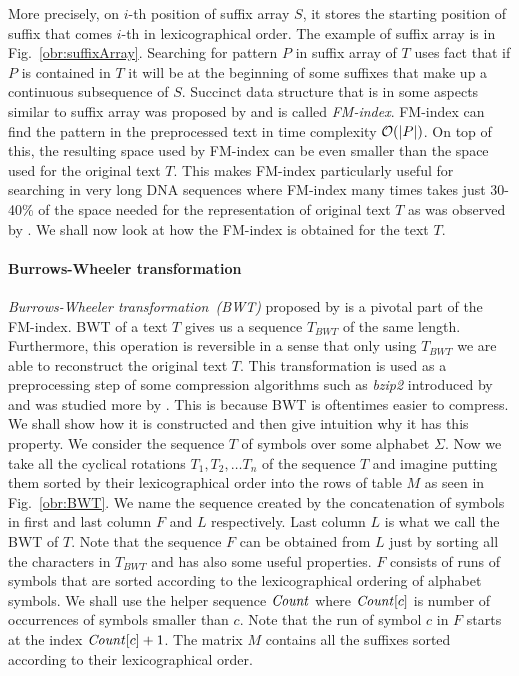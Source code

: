 More precisely, on $i$-th position of suffix array $S$, it stores the starting position of
suffix that comes $i$-th in lexicographical order. The example of suffix array is in
Fig.~\ref{obr:suffixArray}. Searching for pattern $P$ in suffix array of $T$ uses fact that
if $P$ is contained in $T$ it will be at the beginning of some suffixes that make up a
continuous subsequence of $S$. Succinct data structure that is in some aspects similar to
suffix array was proposed by \cite{ferragina2000opportunistic} and is called \textit{FM-index}.
FM-index can find the pattern in the preprocessed text in time complexity $\mathcal{O}(|P|)$. On top
of this, the resulting space used by FM-index can be even smaller than the space used for the original
text $T$. This makes FM-index particularly useful for searching in very long DNA sequences where
FM-index many times takes just 30-40\% of the space needed for the representation of original text
$T$ as was observed by \cite{ferragina2001experimental}. We shall now look at how the FM-index
is obtained for the text $T$.

\paragraph{Burrows-Wheeler transformation}

\textit{Burrows-Wheeler transformation~(BWT)} proposed by \cite{burrows1994block} is a pivotal
part of the FM-index. BWT of a text $T$ gives us a sequence $\mathit{T_{BWT}}$ of the same
length. Furthermore, this operation is reversible in a sense that only using $\mathit{T_{BWT}}$
we are able to reconstruct the original text $T$. This transformation is used as a
preprocessing step of some compression algorithms such as \textit{bzip2} introduced by
\cite{seward1996bzip2} and was studied more by \cite{manzini2001analysis}. This is because
BWT is oftentimes easier to compress. We shall show how it is constructed and then give 
intuition why it has this property. We consider the sequence $T$ of symbols over some
alphabet $\Sigma$. Now we take all the cyclical rotations $T_1, T_2, \ldots T_n$ of
the sequence $T$ and imagine putting them sorted by their lexicographical order into the
rows of table $M$ as seen in Fig.~\ref{obr:BWT}. We name the sequence created by the
concatenation of symbols in first and last column $F$ and $L$ respectively. Last column $L$
is what we call the BWT of $T$. Note that the sequence $F$ can be obtained from $L$ just by
sorting all the characters in $\mathit{T_{BWT}}$ and has also some useful properties. $F$ consists
of runs of symbols that are sorted according to the lexicographical ordering of alphabet symbols.
We shall use the helper sequence $\mathit{Count}$ where $\mathit{Count}[c]$ is number of occurrences of symbols
smaller than $c$. Note that the run of symbol $c$ in $F$ starts at the index $\mathit{Count}[c]+1$. The
matrix $M$ contains all the suffixes sorted according to their lexicographical order.

